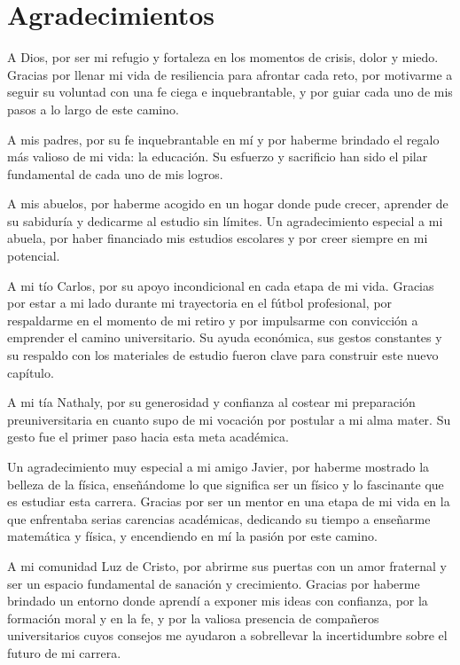 \chapter*{\hfill{\centering Agradecimientos}\hfill}
  A Dios, por ser mi refugio y fortaleza en los momentos de crisis, dolor y miedo. Gracias por llenar mi vida de resiliencia para afrontar cada reto, por motivarme a seguir su voluntad con una fe ciega e inquebrantable, y por guiar cada uno de mis pasos a lo largo de este camino.

A mis padres, por su fe inquebrantable en mí y por haberme brindado el regalo más valioso de mi vida: la educación. Su esfuerzo y sacrificio han sido el pilar fundamental de cada uno de mis logros.

A mis abuelos, por haberme acogido en un hogar donde pude crecer, aprender de su sabiduría y dedicarme al estudio sin límites. Un agradecimiento especial a mi abuela, por haber financiado mis estudios escolares y por creer siempre en mi potencial.

A mi tío Carlos, por su apoyo incondicional en cada etapa de mi vida. Gracias por estar a mi lado durante mi trayectoria en el fútbol profesional, por respaldarme en el momento de mi retiro y por impulsarme con convicción a emprender el camino universitario. Su ayuda económica, sus gestos constantes y su respaldo con los materiales de estudio fueron clave para construir este nuevo capítulo.

A mi tía Nathaly, por su generosidad y confianza al costear mi preparación preuniversitaria en cuanto supo de mi vocación por postular a mi alma mater. Su gesto fue el primer paso hacia esta meta académica.

Un agradecimiento muy especial a mi amigo Javier, por haberme mostrado la belleza de la física, enseñándome lo que significa ser un físico y lo fascinante que es estudiar esta carrera. Gracias por ser un mentor en una etapa de mi vida en la que enfrentaba serias carencias académicas, dedicando su tiempo a enseñarme matemática y física, y encendiendo en mí la pasión por este camino.

A mi comunidad Luz de Cristo, por abrirme sus puertas con un amor fraternal y ser un espacio fundamental de sanación y crecimiento. Gracias por haberme brindado un entorno donde aprendí a exponer mis ideas con confianza, por la formación moral y en la fe, y por la valiosa presencia de compañeros universitarios cuyos consejos me ayudaron a sobrellevar la incertidumbre sobre el futuro de mi carrera.

